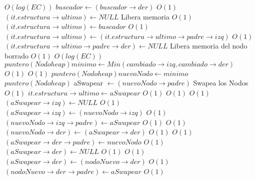 \begin{Algoritmos}
\begin{algorithmic}[1]
						 \Comment $O(log(EC))$
							\State $buscador \gets (buscador \rightarrow der)$ \Comment $O(1)$
						\EndWhile
						\State $(it.estructura \rightarrow ultimo) \gets NULL$ \Comment Libera memoria $O(1)$						
						\State $(it.estructura \rightarrow ultimo) \gets buscador$ \Comment $O(1)$
					\EndIf
				\Else
					\State $(it.estructura \rightarrow ultimo) \gets (it.estructura \rightarrow ultimo \rightarrow padre \rightarrow izq)$ \Comment $O(1)$
					\State $(it.estructura \rightarrow ultimo \rightarrow padre \rightarrow der) \gets NULL$ \Comment Libera memoria del nodo borrado $O(1)$
				\EndIf				
				 \Comment $O(log(EC))$
					\State $puntero(Nodoheap) minimo \gets Min(cambiado \rightarrow izq, cambiado \rightarrow der)$ \Comment $O(1)$
					 \Comment $O(1)$
					\State $puntero(Nodoheap) nuevoNodo \gets minimo$					
					\State $puntero(Nodoheap)$ aSwapear $\gets (nuevoNodo \rightarrow padre)$
    		 \Comment Swapea los Nodos $O(1)$
    			\State $it.estructura \rightarrow ultimo \gets aSwapear$ \Comment $O(1)$
    		\EndIf
			 \Comment $O(1)$
						 \Comment $O(1)$
								\State $(aSwapear \rightarrow izq) \gets NULL$ \Comment $O(1)$
							\Else
								\State $(aSwapear \rightarrow izq) \gets (nuevoNodo \rightarrow izq)$ \Comment $O(1)$
								\State $(nuevoNodo \rightarrow izq \rightarrow padre) \gets aSwapear$ \Comment $O(1)$
							\EndIf
							 \Comment $O(1)$
								\State $(nuevoNodo \rightarrow der) \gets (aSwapear \rightarrow der)$ \Comment $O(1)$
								 \Comment $O(1)$
								\State $(aSwapear \rightarrow der \rightarrow padre) \gets nuevoNodo$	 \Comment $O(1)$						
								\EndIf
								\State $(aSwapear \rightarrow der) \gets NULL$ \Comment $O(1)$
							\Else
								 \Comment $O(1)$
									\State $(aSwapear \rightarrow der) \gets (nodoNuevo \rightarrow der)$ \Comment $O(1)$
									\State $(nodoNuevo \rightarrow der \rightarrow padre) \gets aSwapear$ \Comment $O(1)$

\end{algorithmic}
\end{Algoritmos}
